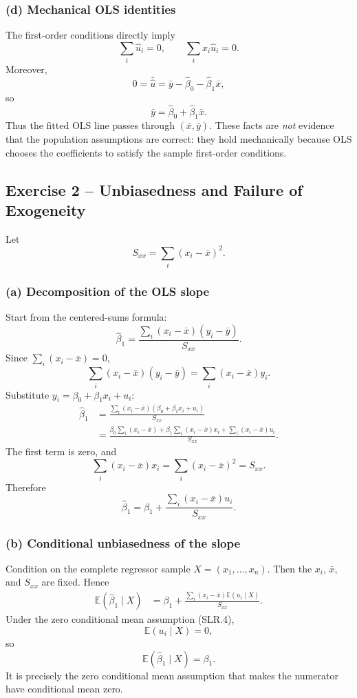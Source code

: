 \documentclass[11pt,a4paper]{article}
\newcommand{\E}{\mathbb{E}}
\newcommand{\Sxx}{S_{xx}}
\begin{document}
\subsubsection*{(d) Mechanical OLS identities}
The first-order conditions directly imply
\[
 \boxed{\sum_i\hat u_i=0},
 \qquad
 \boxed{\sum_i x_i\hat u_i=0}.
\]
Moreover,
\[
 0=\bar{\hat u}=\bar y-\hat\beta_0-\hat\beta_1\bar x,
\]
so
\[
 \boxed{\bar y=\hat\beta_0+\hat\beta_1\bar x}.
\]
Thus the fitted OLS line passes through $(\bar x,\bar y)$. These facts are \emph{not} evidence that the population assumptions are correct: they hold mechanically because OLS chooses the coefficients to satisfy the sample first-order conditions.

\subsection{Exercise 2 -- Unbiasedness and Failure of Exogeneity}
Let
\[
 \Sxx=\sum_i(x_i-\bar x)^2.
\]

\subsubsection*{(a) Decomposition of the OLS slope}
Start from the centered-sums formula:
\[
 \hat\beta_1
 =\frac{\sum_i(x_i-\bar x)(y_i-\bar y)}{\Sxx}.
\]
Since $\sum_i(x_i-\bar x)=0$,
\[
 \sum_i(x_i-\bar x)(y_i-\bar y)
 =\sum_i(x_i-\bar x)y_i.
\]
Substitute $y_i=\beta_0+\beta_1x_i+u_i$:
\begin{align*}
 \hat\beta_1
 &=\frac{\sum_i(x_i-\bar x)(\beta_0+\beta_1x_i+u_i)}{\Sxx}\\
 &=\frac{\beta_0\sum_i(x_i-\bar x)
 +\beta_1\sum_i(x_i-\bar x)x_i
 +\sum_i(x_i-\bar x)u_i}{\Sxx}.
\end{align*}
The first term is zero, and
\[
 \sum_i(x_i-\bar x)x_i
 =\sum_i(x_i-\bar x)^2=\Sxx.
\]
Therefore
\[
 \boxed{
 \hat\beta_1
 =\beta_1+\frac{\sum_i(x_i-\bar x)u_i}{\Sxx}
 }.
\]

\subsubsection*{(b) Conditional unbiasedness of the slope}
Condition on the complete regressor sample $X=(x_1,\ldots,x_n)$. Then the $x_i$, $\bar x$, and $\Sxx$ are fixed. Hence
\begin{align*}
 \E(\hat\beta_1\mid X)
 &=\beta_1+
 \frac{\sum_i(x_i-\bar x)\E(u_i\mid X)}{\Sxx}.
\end{align*}
Under the zero conditional mean assumption (SLR.4),
\[
 \E(u_i\mid X)=0,
\]
so
\[
 \boxed{\E(\hat\beta_1\mid X)=\beta_1}.
\]
It is precisely the zero conditional mean assumption that makes the numerator have conditional mean zero.
\end{document}
